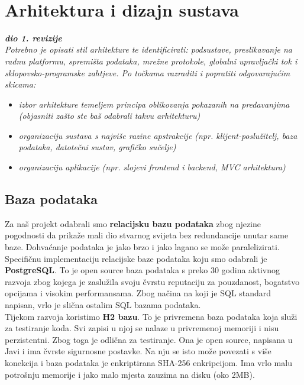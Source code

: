 $  $\chapter{Arhitektura i dizajn sustava}
		
		\textbf{\textit{dio 1. revizije}}\\

		\textit{ Potrebno je opisati stil arhitekture te identificirati: podsustave, preslikavanje na radnu platformu, spremišta podataka, mrežne protokole, globalni upravljački tok i sklopovsko-programske zahtjeve. Po točkama razraditi i popratiti odgovarajućim skicama:}
	\begin{itemize}
		\item 	\textit{izbor arhitekture temeljem principa oblikovanja pokazanih na predavanjima (objasniti zašto ste baš odabrali takvu arhitekturu)}
		\item 	\textit{organizaciju sustava s najviše razine apstrakcije (npr. klijent-poslužitelj, baza podataka, datotečni sustav, grafičko sučelje)}
		\item 	\textit{organizaciju aplikacije (npr. slojevi frontend i backend, MVC arhitektura) }		
	\end{itemize}

	
		

		

				
		\section{Baza podataka}
			
		Za naš projekt odabrali smo \textbf{relacijsku bazu podataka} zbog njezine pogodnosti da prikaže mali dio stvarnog svijeta bez redundancije unutar same baze. Dohvaćanje podataka je jako brzo i jako lagano se može paralelizirati. Specifičnu implementaciju relacijske baze podataka koju smo odabrali je \textbf{PostgreSQL}. To je open source baza podataka s preko 30 godina aktivnog razvoja zbog kojega je zaslužila svoju čvrstu reputaciju za pouzdanost, bogatstvo opcijama i visokim performansama. Zbog načina na koji je SQL standard napisan, vrlo je slična ostalim SQL bazama podataka.\\ 
		
		Tijekom razvoja koristimo \textbf{H2 bazu}. To je privremena baza podataka koja služi za testiranje koda. Svi zapisi u njoj se nalaze u privremenoj memoriji i nisu perzistentni. Zbog toga je odlična za testiranje. Ona je open source, napisana u Javi i ima čvrste sigurnosne postavke. Na nju se isto može povezati s više konekcija i baza podataka je enkriptirana SHA-256 enkripcijom. Ima vrlo malu potrošnju memorije i jako malo mjesta zauzima na disku (oko 2MB). \\ 
		
